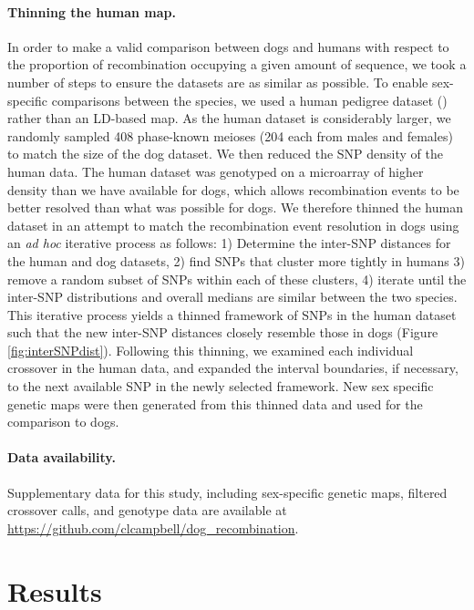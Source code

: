 \paragraph{Thinning the human map.}
In order to make a valid comparison between dogs and humans with respect to the proportion of recombination occupying a given amount of sequence, we took a number of steps to ensure the datasets are as similar as possible.
To enable sex-specific comparisons between the species, we used a human pedigree dataset (\citet{Campbell2015}) rather than an LD-based map.
As the human dataset is considerably larger, we randomly sampled 408 phase-known meioses (204 each from males and females) to match the size of the dog dataset.
We then reduced the SNP density of the human data.
The human dataset was genotyped on a microarray of higher density than we have available for dogs, which allows recombination events to be better resolved than what was possible for dogs.
We therefore thinned the human dataset in an attempt to match the recombination event resolution in dogs using an \textit{ad hoc} iterative process as follows: 
1) Determine the inter-SNP distances for the human and dog datasets,
2) find SNPs that cluster more tightly in humans
3) remove a random subset of SNPs within each of these clusters,
4) iterate until the inter-SNP distributions and overall medians are similar between the two species.
This iterative process yields a thinned framework of SNPs in the human dataset such that the new inter-SNP distances closely resemble those in dogs (Figure \ref{fig:interSNPdist}).
Following this thinning, we examined each individual crossover in the human data, and expanded the interval boundaries, if necessary, to the next available SNP in the newly selected framework.
New sex specific genetic maps were then generated from this thinned data and used for the comparison to dogs.

\paragraph{Data availability.}
Supplementary data for this study, including sex-specific genetic maps, filtered crossover calls, and genotype data are available at 
\\ \url{https://github.com/clcampbell/dog_recombination}.

\section{Results}

